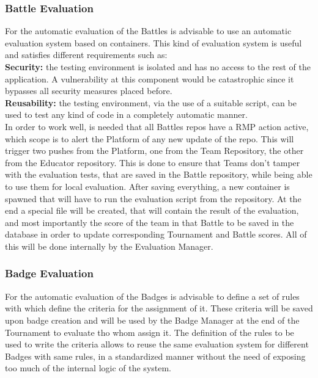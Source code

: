 \subsubsection{Battle Evaluation} \label{parr:battleEvaluation}
For the automatic evaluation of the Battles is advisable to use an automatic evaluation system based on containers.
This kind of evaluation system is useful and satisfies different requirements such as:\\
\textbf{Security:} the testing environment is isolated and has no access to the rest of the application. A vulnerability at this component would be catastrophic since it bypasses all security measures placed before.\\
\textbf{Reusability:} the testing environment, via the use of a suitable script, can be used to test any kind of code in a completely automatic manner.\\
In order to work well, is needed that all Battles repos have a RMP action active, which scope is to alert the Platform of any new update of the repo. This will trigger two pushes from the Platform, one from the Team Repository, the other from the Educator repository. 
This is done to ensure that Teams don't tamper with the evaluation tests, that are saved in the Battle repository, while being able to use them for local evaluation. 
After saving everything, a new container is spawned that will have to run the evaluation script from the repository. 
At the end a special file will be created, that will contain the result of the evaluation, and most importantly the score of the team in that Battle to be saved in the database in order to update corresponding Tournament and Battle scores.
All of this will be done internally by the Evaluation Manager.

\subsubsection{Badge Evaluation} \label{parr:badgeEvaluation}
For the automatic evaluation of the Badges is advisable to define a set of rules with which define the criteria for the assignment of it.
These criteria will be saved upon badge creation and will be used by the Badge Manager at the end of the Tournament to evaluate tho whom assign it.
The definition of the rules to be used to write the criteria allows to reuse the same evaluation system for different Badges with same rules, in a standardized manner without the need of exposing too much of the internal logic of the system.

